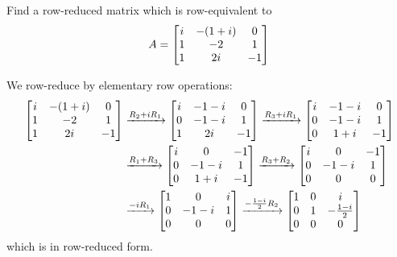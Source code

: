 \begin{xca}
  Find a row-reduced matrix which is row-equivalent to
  \[ A = \begin{bmatrix}i&-(1+i)&0 \\ 1&-2&1 \\ 1&2i&-1\end{bmatrix} \]
\end{xca}
\begin{sol}
  We row-reduce by elementary row operations:
  \begin{equation*}
    \begin{split}
      \begin{bmatrix}i&-(1+i)&0 \\ 1&-2&1 \\ 1&2i&-1\end{bmatrix}
      & \xrightarrow{R_2 + iR_1} \begin{bmatrix}i&-1-i&0 \\ 0&-1-i&1 \\ 1&2i&-1\end{bmatrix}
      \xrightarrow{R_3 + iR_1} \begin{bmatrix}i&-1-i&0 \\ 0&-1-i&1 \\ 0&1+i&-1\end{bmatrix} \\
      & \xrightarrow{R_1 + R_3} \begin{bmatrix}i&0&-1 \\ 0&-1-i&1 \\ 0&1+i&-1\end{bmatrix}
      \xrightarrow{R_3 + R_2} \begin{bmatrix}i&0&-1 \\ 0&-1-i&1 \\ 0&0&0\end{bmatrix} \\
      & \xrightarrow{-iR_1} \begin{bmatrix}1&0&i \\ 0&-1-i&1 \\ 0&0&0\end{bmatrix}
      \xrightarrow{-\frac{1-i}{2}R_2} \begin{bmatrix}1&0&i \\ 0&1&-\frac{1-i}{2} \\ 0&0&0\end{bmatrix}
    \end{split}
  \end{equation*}
  which is in row-reduced form.
\end{sol}

